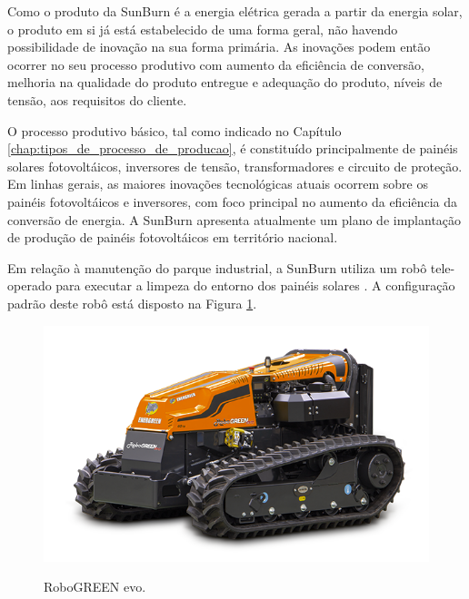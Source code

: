 Como o produto da SunBurn é a energia elétrica gerada a partir da energia solar, o produto em si já está estabelecido de uma forma geral, não havendo possibilidade de inovação na sua forma primária. As inovações podem então ocorrer no seu processo produtivo com aumento da eficiência de conversão, melhoria na qualidade do produto entregue e adequação do produto, níveis de tensão, aos requisitos do cliente.

O processo produtivo básico, tal como indicado no Capítulo \ref{chap:tipos_de_processo_de_producao}, é constituído principalmente de painéis solares fotovoltáicos, inversores de tensão, transformadores e circuito de proteção. Em linhas gerais, as maiores inovações tecnológicas atuais ocorrem sobre os painéis fotovoltáicos e inversores, com foco principal no aumento da eficiência da conversão de energia. A SunBurn apresenta atualmente um plano de implantação de produção de painéis fotovoltáicos em território nacional.

Em relação à manutenção do parque industrial, a SunBurn utiliza um robô tele-operado para executar a limpeza do entorno dos painéis solares \cite{energreen}. A configuração padrão deste robô está disposto na Figura \ref{fig:energreen}.

\begin{figure}
  \caption{RoboGREEN evo.}
  \includegraphics[width=1\textwidth]{images/robogreen_evo.png}
  \label{fig:energreen}
\end{figure}
